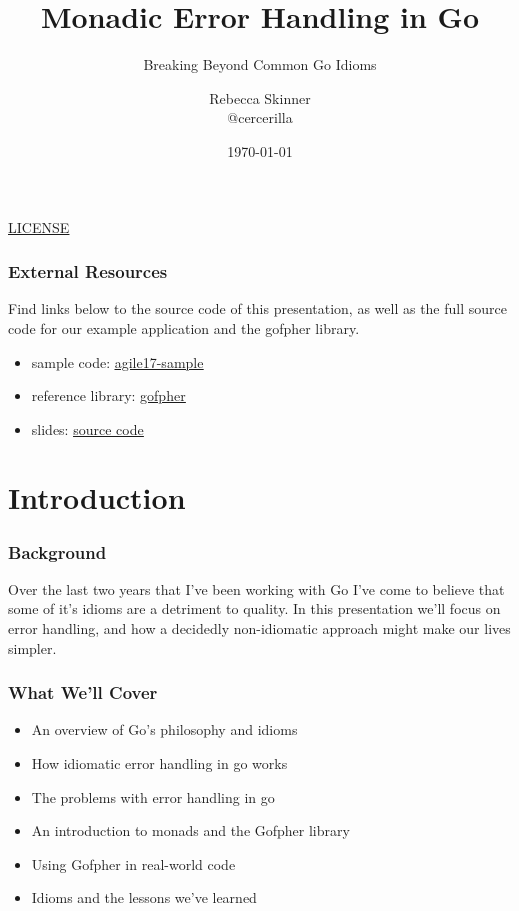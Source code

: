\documentclass{beamer}
\title{Monadic Error Handling in Go}
\subtitle{Breaking Beyond Common Go Idioms}
\author{Rebecca Skinner\\ \small{@cercerilla}}
\institute{Asteris, LLC}
\date{\today}
\newcommand{\chref}[3] {
  {\color{#1} \href{#2}{\underline{#3}}}
}
\begin{document}
\begin{frame}
  \titlepage{}
  \begin{center}
    \small{\chref{blue}{http://creativecommons.org/licenses/by-sa/4.0/}{LICENSE}}
  \end{center}
\end{frame}

\begin{frame}
  \frametitle{External Resources}
  Find links below to the source code of this presentation, as well as
  the full source code for our example application and the gofpher
  library.
  \\\vfill
  \begin{itemize}
  \item sample code: \chref{blue}{https://github.com/rebeccaskinner/agile17-sample}{agile17-sample}
  \item reference library: \chref{blue}{https://github.com/rebeccaskinner/gofpher}{gofpher}
  \item slides: \chref{blue}{https://github.com/rebeccaskinner/presentations/tree/agile-tech-2017/agile_tech_conference_2017}{source code}
  \end{itemize}
\end{frame}

\section{Introduction}
\begin{frame}
  \frametitle{Background}
  Over the last two years that I've been working with Go I've come to
  believe that some of it's idioms are a detriment to quality. In this
  presentation we'll focus on error handling, and how a decidedly
  non-idiomatic approach might make our lives simpler.
\end{frame}

\begin{frame}
  \frametitle{What We'll Cover}
  \begin{itemize}
  \item An overview of Go's philosophy and idioms
    \pause
  \item How idiomatic error handling in go works
    \pause
  \item The problems with error handling in go
    \pause
  \item An introduction to monads and the Gofpher library
    \pause
  \item Using Gofpher in real-world code
    \pause
  \item Idioms and the lessons we've learned
  \end{itemize}
\end{frame}
\end{document}
